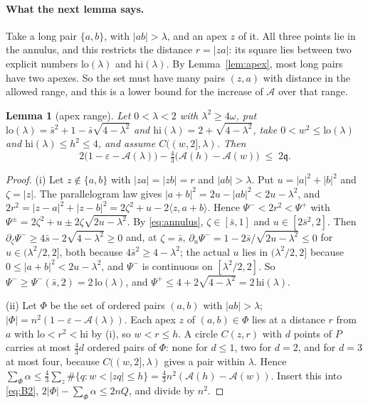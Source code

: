 \documentclass[11pt]{article}
\newcommand{\eps}{\varepsilon}
\newcommand{\cA}{\mathcal{A}}
\newcommand{\qq}{\mathfrak{q}}
\newcommand{\sbar}{\bar{s}}
\newtheorem{lemma}[theorem]{Lemma}
\theoremstyle{remark}
\begin{document}
\paragraph{What the next lemma says.} Take a long pair $\{a,b\}$, with
$|ab| > \lambda$, and an apex $z$ of it. All three points lie in the
annulus, and this restricts the distance $r = |za|$: its square lies
between two explicit numbers $\mathrm{lo}(\lambda)$ and
$\mathrm{hi}(\lambda)$. By Lemma~\ref{lem:apex}, most long pairs have two
apexes. So the set must have many pairs $(z, a)$ with distance in the
allowed range, and this is a lower bound for the increase of $\cA$ over
that range.

\begin{lemma}[apex range]\label{lem:Apex}
Let $0 < \lambda < 2$ with $\lambda^2 \ge 4\omega$, put
$\mathrm{lo}(\lambda) = \sbar^2 + 1 - \sbar\sqrt{4-\lambda^2}$ and
$\mathrm{hi}(\lambda) = 2 + \sqrt{4 - \lambda^2}$, take
$0 < w^2 \le \mathrm{lo}(\lambda)$ and $\mathrm{hi}(\lambda) \le h^2 \le 4$,
and assume $C((w,2],\lambda)$. Then
\[
  2\bigl(1-\eps-\cA(\lambda)\bigr) - \tfrac43\bigl(\cA(h) - \cA(w)\bigr)
  \;\le\; 2\qq .
\]
\end{lemma}

\begin{proof}
(i) Let $z \notin \{a,b\}$ with $|za| = |zb| = r$ and $|ab| > \lambda$. Put
$u = |a|^2 + |b|^2$ and $\zeta = |z|$. The parallelogram law gives
$|a+b|^2 = 2u - |ab|^2 < 2u - \lambda^2$, and
$2r^2 = |z-a|^2 + |z-b|^2 = 2\zeta^2 + u - 2\langle z, a+b\rangle$. Hence
$\Psi^- < 2r^2 < \Psi^+$ with
$\Psi^\pm = 2\zeta^2 + u \pm 2\zeta\sqrt{2u - \lambda^2}$. By
\eqref{eq:annulus}, $\zeta \in [\sbar,1]$ and $u \in [2\sbar^2, 2]$. Then
$\partial_\zeta \Psi^- \ge 4\sbar - 2\sqrt{4 - \lambda^2} \ge 0$ and, at
$\zeta = \sbar$, $\partial_u\Psi^- = 1 - 2\sbar/\sqrt{2u-\lambda^2} \le 0$
for $u \in (\lambda^2/2, 2]$, both because $4\sbar^2 \ge 4 - \lambda^2$;
the actual $u$ lies in $(\lambda^2/2, 2]$ because $0 \le |a+b|^2 < 2u - \lambda^2$, and $\Psi^-$ is continuous on
$[\lambda^2/2, 2]$. So
$\Psi^- \ge \Psi^-(\sbar, 2) = 2\,\mathrm{lo}(\lambda)$, and
$\Psi^+ \le 4 + 2\sqrt{4-\lambda^2} = 2\,\mathrm{hi}(\lambda)$.

(ii) Let $\Phi$ be the set of ordered pairs $(a,b)$ with $|ab| > \lambda$;
$|\Phi| = n^2(1 - \eps - \cA(\lambda))$. Each apex $z$ of $(a,b) \in \Phi$
lies at a distance $r$ from $a$ with $\mathrm{lo} < r^2 < \mathrm{hi}$ by
(i), so $w < r \le h$. A circle $C(z,r)$ with $d$ points of $P$ carries at
most $\frac43 d$ ordered pairs of $\Phi$: none for $d \le 1$, two for
$d = 2$, and for $d = 3$ at most four, because $C((w,2],\lambda)$ gives a
pair within $\lambda$. Hence $\sum_\Phi \alpha \le \frac43\sum_z\#\{q :
w < |zq| \le h\} = \frac43 n^2(\cA(h) - \cA(w))$. Insert this into
\eqref{eq:B2}, $2|\Phi| - \sum_\Phi\alpha \le 2nQ$, and divide by $n^2$.
\end{proof}
\end{document}
